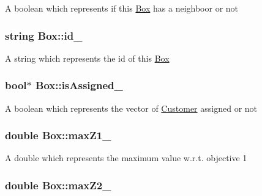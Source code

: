 \-A boolean which represents if this {\ttfamily \hyperlink{classBox}{\-Box}} has a neighboor or not \hypertarget{classBox_a69b7a7bb25fe90a42147cd05007854da}{
\subsubsection[{id\-\_\-}]{\setlength{\rightskip}{0pt plus 5cm}string {\bf \-Box\-::id\-\_\-}}}\label{classBox_a69b7a7bb25fe90a42147cd05007854da}
\-A string which represents the id of this {\ttfamily \hyperlink{classBox}{\-Box}} \hypertarget{classBox_abbfd7bd74fe08139f7e6853e129a8a61}{
\subsubsection[{is\-Assigned\-\_\-}]{\setlength{\rightskip}{0pt plus 5cm}bool$\ast$ {\bf \-Box\-::is\-Assigned\-\_\-}}}\label{classBox_abbfd7bd74fe08139f7e6853e129a8a61}
\-A boolean which represents the vector of {\ttfamily \hyperlink{classCustomer}{\-Customer}} assigned or not \hypertarget{classBox_a677f915123e884e3ccf7c751bfbd7cfa}{
\subsubsection[{max\-Z1\-\_\-}]{\setlength{\rightskip}{0pt plus 5cm}double {\bf \-Box\-::max\-Z1\-\_\-}}}\label{classBox_a677f915123e884e3ccf7c751bfbd7cfa}
\-A double which represents the maximum value w.\-r.\-t. objective 1 \hypertarget{classBox_a5222f7d544c4361107c8ff730d341be1}{
\subsubsection[{max\-Z2\-\_\-}]{\setlength{\rightskip}{0pt plus 5cm}double {\bf \-Box\-::max\-Z2\-\_\-}}}\label{classBox_a5222f7d544c4361107c8ff730d341be1}
